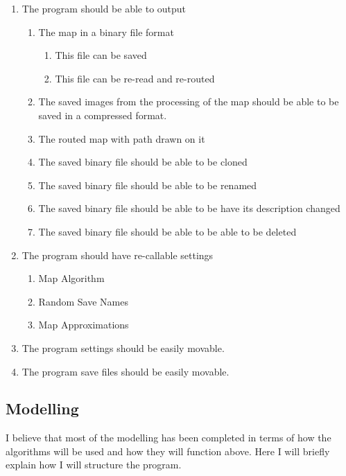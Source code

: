 \begin{FlushLeft}
        \begin{enumerate}[resume]
            \item The program should be able to output
            \begin{enumerate}
                \item The map in a binary file format
                \begin{enumerate}
                    \item This file can be saved
                    \item This file can be re-read and re-routed
                \end{enumerate}
                \item The saved images from the processing of the map should be able to be saved in a compressed format.
                \item The routed map with path drawn on it
                \item The saved binary file should be able to be cloned
                \item The saved binary file should be able to be renamed
                \item The saved binary file should be able to be have its description changed
                \item The saved binary file should be able to be able to be deleted                
            \end{enumerate}
            \item The program should have re-callable settings
            \begin{enumerate}
                \item Map Algorithm
                \item Random Save Names
                \item Map Approximations
            \end{enumerate}
            \item The program settings should be easily movable.
            \item The program save files should be easily movable.
        \end{enumerate}

        \bk

        \subsection{Modelling}
            I believe that most of the modelling has been completed in terms of how the algorithms will be used and how they will function above. Here I will briefly explain how I will structure the program.


\end{FlushLeft}
